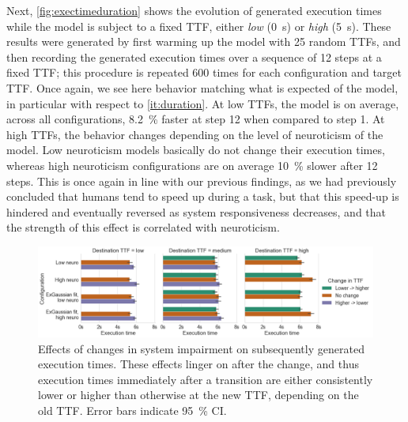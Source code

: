 Next, \cref{fig:exectimeduration} shows the evolution of generated execution times while the model is subject to a fixed \gls{TTF}, either \emph{low} (\SI{0}{\second}) or \emph{high} (\SI{5}{\second}).
These results were generated by first warming up the model with \num{25} random \glspl{TTF}, and then recording the generated execution times over a sequence of \num{12} steps at a fixed \gls{TTF}; this procedure is repeated \num{600} times for each configuration and target \gls{TTF}.
Once again, we see here behavior matching what is expected of the model, in particular with respect to \cref{it:duration}.
At low \glspl{TTF}, the model is on average, across all configurations, \SI{8.2}{\percent} faster at step \num{12} when compared to step \num{1}.
At high \glspl{TTF}, the behavior changes depending on the level of neuroticism of the model.
Low neuroticism models basically do not change their execution times, whereas high neuroticism configurations are on average \SI{10}{\percent} slower after \num{12} steps.
This is once again in line with our previous findings, as we had previously concluded that humans tend to speed up during a task, but that this speed-up is hindered and eventually reversed as system responsiveness decreases, and that the strength of this effect is correlated with neuroticism.

\begin{figure}
    \centering
    \includegraphics[width=\textwidth]{figs/new_model/transitions}
    \caption{%
        Effects of changes in system impairment on subsequently generated execution times.
        These effects linger on after the change, and thus execution times immediately after a transition are either consistently lower or higher than otherwise at the new \gls{TTF}, depending on the old \gls{TTF}.
        Error bars indicate \SI{95}{\percent} \gls{CI}.
    }\label{fig:transitions}
\end{figure}

